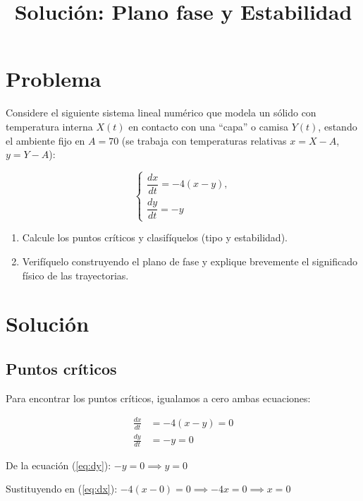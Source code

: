 \documentclass{article}
\begin{document}
\title{Solución: Plano fase y Estabilidad}
\author{}
\date{}
\maketitle

\section{Problema}
Considere el siguiente sistema lineal numérico que modela un sólido con temperatura interna $X(t)$ en contacto con una ``capa'' o camisa $Y(t)$, estando el ambiente fijo en $A = 70$ (se trabaja con temperaturas relativas $x = X - A$, $y = Y - A$):

\begin{equation}
    \begin{cases}
        \dfrac{dx}{dt} = -4(x - y), \\
        \dfrac{dy}{dt} = -y
    \end{cases}
\end{equation}

\begin{enumerate}
    \item Calcule los puntos críticos y clasifíquelos (tipo y estabilidad).
    \item Verifíquelo construyendo el plano de fase y explique brevemente el significado físico de las trayectorias.
\end{enumerate}

\section{Solución}

\subsection{Puntos críticos}

Para encontrar los puntos críticos, igualamos a cero ambas ecuaciones:

\begin{align}
    \frac{dx}{dt} &= -4(x - y) = 0 \label{eq:dx} \\
    \frac{dy}{dt} &= -y = 0 \label{eq:dy}
\end{align}

De la ecuación (\ref{eq:dy}): $-y = 0 \implies y = 0$

Sustituyendo en (\ref{eq:dx}): $-4(x - 0) = 0 \implies -4x = 0 \implies x = 0$
\end{document}
